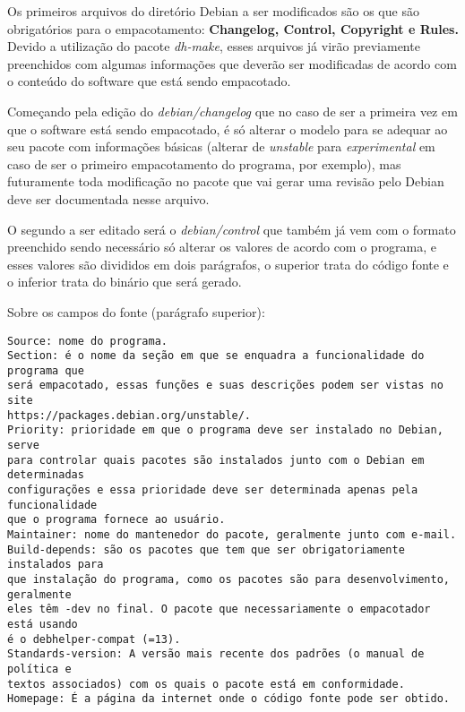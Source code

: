 Os primeiros arquivos do diretório Debian a ser modificados são os que são obrigatórios para o empacotamento:\textbf{ Changelog, Control, Copyright e Rules.} Devido a utilização do pacote \textit{dh-make}, esses arquivos já virão previamente preenchidos com algumas informações que deverão ser modificadas de acordo com o conteúdo do software que está sendo empacotado.

Começando pela edição do \textit{debian/changelog} que no caso de ser a primeira vez em que o software está sendo empacotado, é só alterar o modelo para se adequar ao seu pacote com informações básicas (alterar de \textit{unstable} para \textit{experimental} em caso de ser o primeiro empacotamento do programa, por exemplo), mas futuramente toda modificação no pacote que vai gerar uma revisão pelo Debian deve ser documentada nesse arquivo. 

O segundo a ser editado será o \textit{debian/control} que também já vem com o formato preenchido sendo necessário só alterar os valores de acordo com o programa, e esses valores são divididos em dois parágrafos, o superior trata do código fonte e o inferior trata do binário que será gerado.

Sobre os campos do fonte (parágrafo superior):
\begin{verbatim}
Source: nome do programa.
Section: é o nome da seção em que se enquadra a funcionalidade do programa que
será empacotado, essas funções e suas descrições podem ser vistas no site 
https://packages.debian.org/unstable/.
Priority: prioridade em que o programa deve ser instalado no Debian, serve
para controlar quais pacotes são instalados junto com o Debian em determinadas 
configurações e essa prioridade deve ser determinada apenas pela funcionalidade
que o programa fornece ao usuário.
Maintainer: nome do mantenedor do pacote, geralmente junto com e-mail.
Build-depends: são os pacotes que tem que ser obrigatoriamente instalados para
que instalação do programa, como os pacotes são para desenvolvimento, geralmente
eles têm -dev no final. O pacote que necessariamente o empacotador está usando
é o debhelper-compat (=13).
Standards-version: A versão mais recente dos padrões (o manual de política e
textos associados) com os quais o pacote está em conformidade. 
Homepage: É a página da internet onde o código fonte pode ser obtido.
\end{verbatim}

